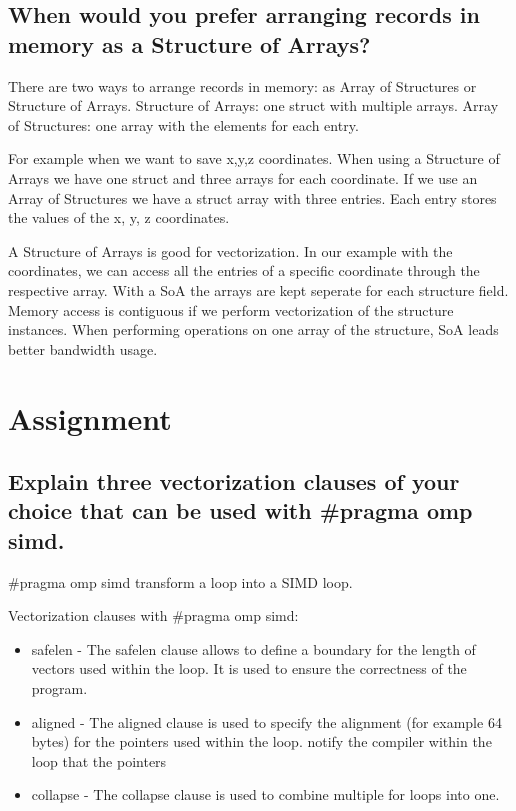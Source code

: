 \documentclass[runningheads]{llncs}
\begin{document}
\subsection{When would you prefer arranging records in memory as a Structure of Arrays?}
There are two ways to arrange records in memory: as Array of Structures or Structure of Arrays.
Structure of Arrays: one struct with multiple arrays.
Array of Structures: one array with the elements for each entry.

For example when we want to save x,y,z coordinates. When using a Structure of Arrays we have one struct and three arrays for each coordinate.
If we use an Array of Structures we have a struct array with three entries. Each entry stores the values of the x, y, z coordinates.

A Structure of Arrays is good for vectorization. In our example with the coordinates, we can access all the entries of a specific coordinate
through the respective array.
With a SoA the arrays are kept seperate for each structure field. Memory access is contiguous if we perform vectorization of the structure instances.
When performing operations on one array of the structure, SoA leads better bandwidth usage.


\section{Assignment}

\subsection{Explain three vectorization clauses of your choice that can be used with \#pragma omp simd.}
\#pragma omp simd transform a loop into a SIMD loop.

Vectorization clauses with \#pragma omp simd:
\begin{itemize}
	\item safelen - The safelen clause allows to define a boundary for the length of vectors used 
	within the loop. It is used to ensure the correctness of the program.
	\item aligned - The aligned clause is used to specify the alignment (for example 64 bytes) for 
	the pointers used within the loop.
	notify the compiler within the loop that the pointers 
	\item collapse - The collapse clause is used to combine multiple for loops into one.
\end{itemize}
\end{document}
